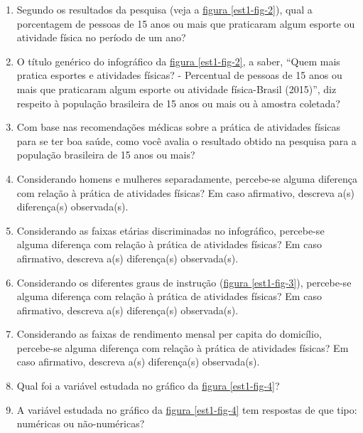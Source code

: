 \documentclass[10 pt,usenames,dvipsnames, oneside]{article}
\begin{document}
\begin{enumerate}
\item {} 
Segundo os resultados da pesquisa (veja a \hyperref[est1-fig-2]{figura \ref{est1-fig-2}}), qual a porcentagem de pessoas de 15 anos ou mais que praticaram algum esporte ou atividade física no período de um ano?

\item {} 
O título genérico do infográfico da \hyperref[est1-fig-2]{figura \ref{est1-fig-2}}, a saber, “Quem mais pratica esportes e atividades físicas? - Percentual de pessoas de 15 anos ou mais que praticaram algum esporte ou atividade física-Brasil (2015)”, diz respeito à população brasileira de 15 anos ou mais ou à amostra coletada?

\item {} 
Com base nas recomendações médicas sobre a prática de atividades físicas para se ter boa saúde, como você avalia o resultado obtido na pesquisa para a população brasileira de 15 anos ou mais?

\item {} 
Considerando homens e mulheres separadamente, percebe-se alguma diferença com relação à prática de atividades físicas? Em caso afirmativo, descreva a(s) diferença(s) observada(s).

\item {} 
Considerando as faixas etárias discriminadas no infográfico, percebe-se alguma diferença com relação à prática de atividades físicas? Em caso afirmativo, descreva a(s) diferença(s) observada(s).

\item {} 
Considerando os diferentes graus de instrução (\hyperref[est1-fig-3]{figura \ref{est1-fig-3}}), percebe-se alguma diferença com relação à prática de atividades físicas? Em caso afirmativo, descreva a(s) diferença(s) observada(s).

\item {} 
Considerando as faixas de rendimento mensal per capita do domicílio, percebe-se alguma diferença com relação à prática de atividades físicas? Em caso afirmativo, descreva a(s) diferença(s) observada(s).

\item {} 
Qual foi a variável estudada no gráfico da \hyperref[est1-fig-4]{figura \ref{est1-fig-4}}?

\item {} 
A variável estudada no gráfico da \hyperref[est1-fig-4]{figura \ref{est1-fig-4}} tem respostas de que tipo: numéricas ou não-numéricas?


\end{enumerate}
\end{document}
